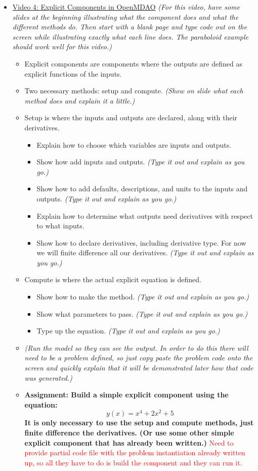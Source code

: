 \documentclass[12pt, letterpaper]{article}
\begin{document}
\begin{itemize}
	\item \underline{Video 4: Explicit Components in OpenMDAO} \textit{(For this video, have some slides at the beginning illustrating what the 				component does and what the different methods do. Then start with a blank page and type code out on the screen while illustrating exactly what each line does. The 	paraboloid example should work well for this video.)}
		\begin{itemize}
			\item Explicit components are components where the outputs are defined as explicit functions of the inputs.
			\item Two necessary methods: setup and compute. \textit{(Show on slide what each method does and explain it a little.)}
			\item Setup is where the inputs and outputs are declared, along with their derivatives.
				\begin{itemize}
					\item Explain how to choose which variables are inputs and outputs.
					\item Show how add inputs and outputs. \textit{(Type it out and explain as you go.)}
					\item Show how to add defaults, descriptions, and units to the inputs and outputs. \textit{(Type it out and explain as you go.)}
					\item Explain how to determine what outputs need derivatives with respect to what inputs.
					\item Show how to declare derivatives, including derivative type. For now we will finite difference all our derivatives. \textit{(Type it out and explain as you go.)}
				\end{itemize}
			\item Compute is where the actual explicit equation is defined.
				\begin{itemize}
					\item Show how to make the method. \textit{(Type it out and explain as you go.)}
					\item Show what parameters to pass. \textit{(Type it out and explain as you go.)}
					\item Type up the equation. \textit{(Type it out and explain as you go.)}
				\end{itemize}
			\item \textit{(Run the model so they can see the output. In order to do this there will need to be a problem defined, so just copy paste the 				problem code onto the screen and quickly explain that it will be demonstrated later how that code was generated.)}
			\item \textbf{Assignment: Build a simple explicit component using the equation: $$y(x)=x^4+2x^2+5$$ It is only necessary to use the 						setup and compute methods, just finite difference the derivatives. (Or use some other simple explicit component that has already been 						written.)} \textcolor{red}{Need to provide partial code file with the problem instantiation already written up, so all they have to do is build the component and they can run it.}
		\end{itemize}


\end{itemize}
\end{document}
